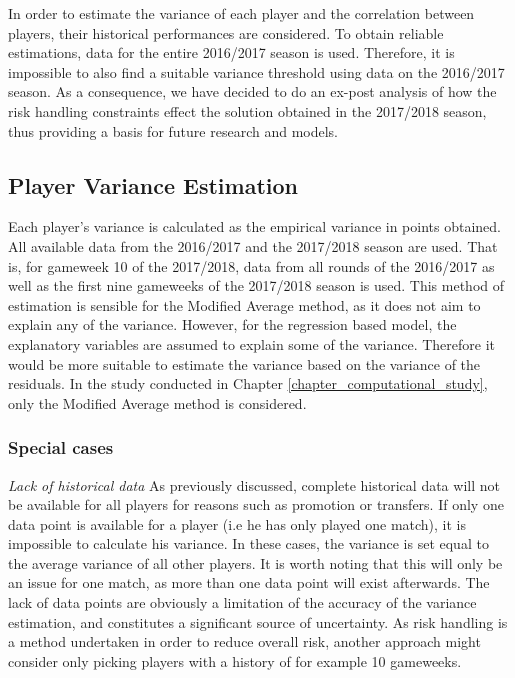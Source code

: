 In order to estimate the variance of each player and the correlation between players, their historical performances are considered. To obtain reliable estimations, data for the entire 2016/2017 season is used. Therefore, it is impossible to also find a suitable variance threshold using data on the 2016/2017 season. As a consequence, we have decided to do an ex-post analysis of how the risk handling constraints effect the solution obtained in the 2017/2018 season, thus providing a basis for future research and models.

\subsection{Player Variance Estimation}

Each player's variance is calculated as the empirical variance in points obtained. All available data from the 2016/2017 and the 2017/2018 season are used. That is, for gameweek 10 of the 2017/2018, data from all rounds of the 2016/2017 as well as the first nine gameweeks of the 2017/2018 season is used. This method of estimation is sensible for the Modified Average method, as it does not aim to explain any of the variance. However, for the regression based model, the explanatory variables are assumed to explain some of the variance. Therefore it would be more suitable to estimate the variance based on the variance of the residuals. In the study conducted in Chapter \ref{chapter_computational_study}, only the Modified Average method is considered. 

\newpar

\subsubsection{Special cases}

\textit{Lack of historical data}
\newline
As previously discussed, complete historical data will not be available for all players for reasons such as promotion or transfers. If only one data point is available for a player (i.e he has only played one match), it is impossible to calculate his variance. In these cases, the variance is set equal to the average variance of all other players. It is worth noting that this will only be an issue for one match, as more than one data point will exist afterwards. The lack of data points are obviously a limitation of the accuracy of the variance estimation, and constitutes a significant source of uncertainty. As risk handling is a method undertaken in order to reduce overall risk, another approach might consider only picking players with a history of for example 10 gameweeks. \newpar

